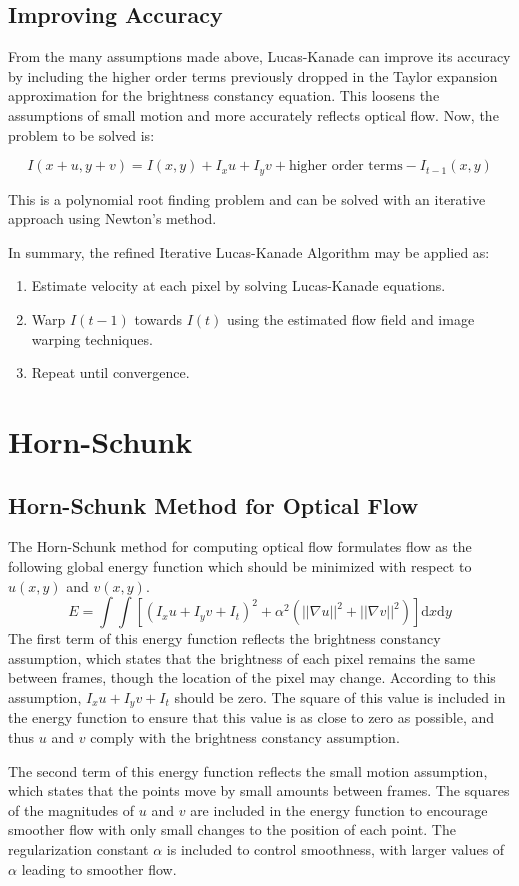 \documentclass{article}
\begin{document}
\subsection{Improving Accuracy}
From the many assumptions made above, Lucas-Kanade can improve its accuracy by including the higher order terms previously dropped in the Taylor expansion approximation for the brightness constancy equation. This loosens the assumptions of small motion and more accurately reflects optical flow. Now, the problem to be solved is:

\[ I(x+u, y+v) = I(x,y) + I_xu + I_yv + \text{higher order terms} - I_{t-1}(x,y)\]

This is a polynomial root finding problem and can be solved with an iterative approach using Newton’s method. 

In summary, the refined Iterative Lucas-Kanade Algorithm may be applied as:
\begin{enumerate}
\item Estimate velocity at each pixel by solving Lucas-Kanade equations.
\item Warp $I(t-1)$ towards $I(t)$ using the estimated flow field and image warping techniques.
\item Repeat until convergence.
\end{enumerate}


\section{Horn-Schunk}

\subsection{Horn-Schunk Method for Optical Flow}
The Horn-Schunk method for computing optical flow formulates flow as the following global energy function which should be minimized with respect to $u(x,y)$ and $v(x,y)$.
\[E=\int\int[(I_xu+I_yv+I_t)^2+\alpha^2(||\nabla u||^2+||\nabla v||^2)]\mathrm{d}x \mathrm{d}y\]
The first term of this energy function reflects the brightness constancy assumption, which states that the brightness of each pixel remains the same between frames, though the location of the pixel may change. According to this assumption, $I_xu+I_yv+I_t$ should be zero. The square of this value is included in the energy function to ensure that this value is as close to zero as possible, and thus $u$ and $v$ comply with the brightness constancy assumption.

The second term of this energy function reflects the small motion assumption, which states that the points move by small amounts between frames. The squares of the magnitudes of $u$ and $v$ are included in the energy function to encourage smoother flow with only small changes to the position of each point. The regularization constant $\alpha$ is included to control smoothness, with larger values of $\alpha$ leading to smoother flow.
\end{document}
